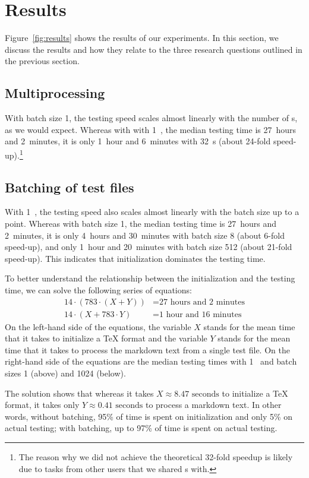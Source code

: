 \documentclass[final]{ltugboat}
\begin{document}
\section{Results}
\label{sec:results}

Figure~\ref{fig:results} shows the results of our experiments. In this section, we discuss the results and how they relate to the three research questions outlined in the previous section.

\subsection{Multiprocessing}
With batch size 1, the testing speed scales almost linearly with the number of s, as we would expect. Whereas with with 1~, the median testing time is 27~hours and 2~minutes, it is only 1~hour and 6~minutes with 32~s (about 24-fold speed-up).\footnote{The reason why we did not achieve the theoretical 32-fold speedup is likely due to tasks from other users that we shared s with.}

\subsection{Batching of test files}
With 1~, the testing speed also scales almost linearly with the batch size up to a point. Whereas with batch size 1, the median testing time is 27~hours and 2~minutes, it is only 4~hours and 30~minutes with batch size 8 (about 6-fold speed-up), and only 1~hour and 20~minutes with batch size 512 (about 21-fold speed-up). This indicates that initialization dominates the testing time.

To better understand the relationship between the initialization and the testing time, we can solve the following series of equations:
\begin{align*}
    14\cdot(783\cdot(X + Y)) &= \text{27 hours and 2 minutes} \\
    14\cdot(X + 783\cdot Y) &= \text{1 hour and 16 minutes}
\end{align*}
On the left-hand side of the equations, the variable $X$ stands for the mean time that it takes to initialize a \TeX{} format and the variable $Y$ stands for the mean time that it takes to process the markdown text from a single test file. On the right-hand side of the equations are the median testing times with 1~ and batch sizes 1 (above) and 1024 (below).

The solution shows that whereas it takes $X\approx\text{8.47 seconds}$ to initialize a \TeX{} format, it takes only $Y\approx\text{0.41 seconds}$ to process a markdown text. In other words, without batching, 95\% of time is spent on initialization and only 5\% on actual testing; with batching, up to 97\% of time is spent on actual testing.
\end{document}
